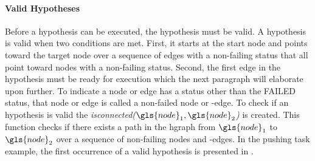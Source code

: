 \paragraph{Valid Hypotheses}
Before a hypothesis can be executed, the hypothesis must be valid. A hypothesis is valid when two conditions are met. First, it starts at the start node and points toward the target node over a sequence of edges with a non-failing status that all point toward nodes with a non-failing status. Second, the first edge in the hypothesis must be ready for execution which the next paragraph will elaborate upon further. To indicate a node or edge has a status other than the FAILED status, that node or edge is called a non-failed node or -edge. To check if an hypothesis is valid the \textit{isconnected($\gls{node}_1, \gls{node}_2$)} is created. This function checks if there exists a path in the \ac{hgraph} from $\gls{node}_1$ to $\gls{node}_2$ over a sequence of non-failing nodes and -edges. In the pushing task example, the first occurrence of a valid hypothesis is presented in .\bs

